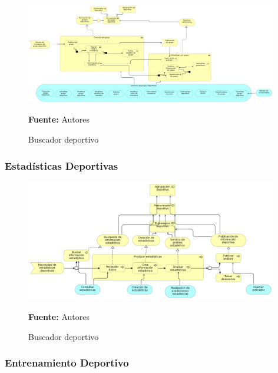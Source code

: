 \begin{figure}[!htb]
  \begin{center}
    \includegraphics[width=11cm]{./imagenes/business_process/formaciongruposdeportivos.png}
    \caption{Buscador deportivo}
    \label{fig:BF_BuscadorDeportivo}
    \textbf{Fuente:}  Autores
  \end{center}
\end{figure}

\clearpage

\subsubsection{Estadísticas Deportivas}

\begin{figure}[!htb]
  \begin{center}
    \includegraphics[width=11cm]{./imagenes/business_process/estadisticasdeportivas.png}
    \caption{Buscador deportivo}
    \label{fig:BF_BuscadorDeportivo}
    \textbf{Fuente:}  Autores
  \end{center}
\end{figure}

\subsubsection{Entrenamiento Deportivo}

